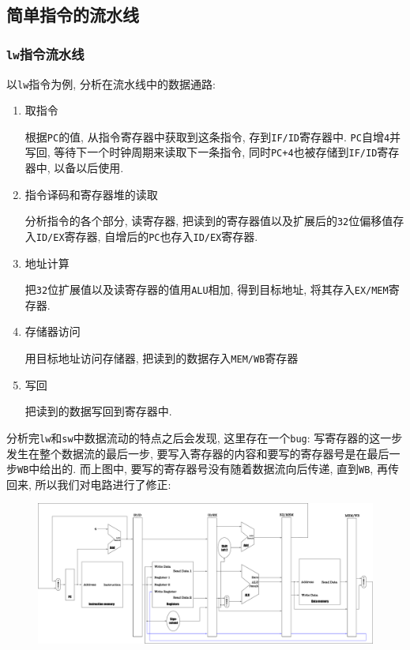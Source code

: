 \subsection{简单指令的流水线}
\subsubsection{\texttt{lw}指令流水线}
以\verb|lw|指令为例, 分析在流水线中的数据通路:
\begin{enumerate}
\item {\kaishu 取指令} \par 根据\verb|PC|的值, 从指令寄存器中获取到这条指令, 存到\verb|IF/ID|寄存器中. \verb|PC|自增\verb|4|并写回, 等待下一个时钟周期来读取下一条指令, 同时\verb|PC+4|也被存储到\verb|IF/ID|寄存器中, 以备以后使用.
\item {\kaishu 指令译码和寄存器堆的读取} \par 分析指令的各个部分, 读寄存器, 把读到的寄存器值以及扩展后的\verb|32|位偏移值存入\verb|ID/EX|寄存器, 自增后的\verb|PC|也存入\verb|ID/EX|寄存器.
\item {\kaishu 地址计算} \par 把\verb|32|位扩展值以及读寄存器的值用\verb|ALU|相加, 得到目标地址, 将其存入\verb|EX/MEM|寄存器.
\item {\kaishu 存储器访问} \par 用目标地址访问存储器, 把读到的数据存入\verb|MEM/WB|寄存器
\item {\kaishu 写回} \par 把读到的数据写回到寄存器中.
\end{enumerate}\par
分析完\verb|lw|和\verb|sw|中数据流动的特点之后会发现, 这里存在一个\verb|bug|: 写寄存器的这一步发生在整个数据流的最后一步, 要写入寄存器的内容和要写的寄存器号是在最后一步\verb|WB|中给出的. 而上图中, 要写的寄存器号没有随着数据流向后传递, 直到\verb|WB|, 再传回来, 所以我们对电路进行了修正:
\begin{figure}[H]
\centering
\includegraphics[scale=.2]{img/figure51.pdf}
\end{figure}
